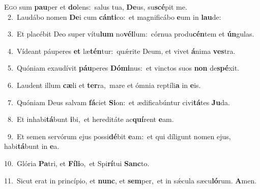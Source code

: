 \lettrine{\initial\textcolor{\initialcolor}{E}}{go} sum \textbf{pau}\-per et \textbf{do}\-lens:~\star salus tua, \textbf{De}\-us, su\-\textbf{scé}\-pit me.\\
{\numbfont\textcolor{\numbcolor}{~2.}}~Laudábo nomen \textbf{De}\-i cum \textbf{cán}\-\textbf{ti}co:~\star et magnificábo \textbf{e}\-um in \textbf{lau}\-de:\par
{\numbfont\textcolor{\numbcolor}{~3.}}~Et placébit Deo super vítu\textbf{lum} no\-\textbf{vél}\-lum:~\star córnua produ\-\textbf{cén}\-tem et \textbf{ún}\-gulas.\par
{\numbfont\textcolor{\numbcolor}{~4.}}~Vídeant páuperes \textbf{et} læ\-\textbf{tén}\-tur:~\star quǽrite Deum, et vivet \textbf{á}\-nima \textbf{ves}\-tra.\par
{\numbfont\textcolor{\numbcolor}{~5.}}~Quóniam exaudívit \textbf{páu}\-peres \textbf{Dó}\-\textbf{mi}nus:~\star et vinctos suos \textbf{non} de\-\textbf{spé}\-xit.\par
{\numbfont\textcolor{\numbcolor}{~6.}}~Laudent illum \textbf{cæ}\-li et \textbf{ter}\-ra,~\star mare et ómnia reptíli\textbf{a} in \textbf{e}\-is.\par
{\numbfont\textcolor{\numbcolor}{~7.}}~Quóniam Deus salvam \textbf{fá}\-ciet \textbf{Si}\-on:~\star et ædificabúntur civi\-\textbf{tá}\-tes \textbf{Ju}\-da.\par
{\numbfont\textcolor{\numbcolor}{~8.}}~Et inhabi\-\textbf{tá}\-bunt \textbf{i}\-bi,~\star et hereditáte ac\-\textbf{quí}\-rent \textbf{e}\-am.\par
{\numbfont\textcolor{\numbcolor}{~9.}}~Et semen servórum ejus possi\-\textbf{dé}\-bit \textbf{e}\-am:~\star et qui díligunt nomen ejus, habi\-\textbf{tá}\-bunt in \textbf{e}\-a.\par
{\numbfont\textcolor{\numbcolor}{10.}}~Glória \textbf{Pa}\-tri, et \textbf{Fí}\-\textbf{li}o,~\star et Spi\-\textbf{rí}\-tui \textbf{Sanc}\-to.\par
{\numbfont\textcolor{\numbcolor}{11.}}~Sicut erat in princípio, et \textbf{nunc}\-, et \textbf{sem}\-per,~\star et in sǽcula sæcu\-\textbf{ló}\-rum. \textbf{A}\-men.\par

